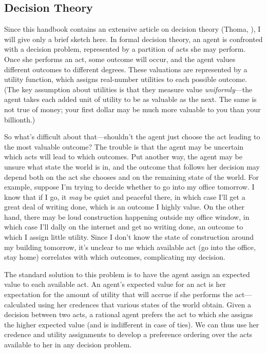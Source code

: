 \subsection{Decision Theory} \label{ss:decision}
Since this handbook contains an extensive article on decision theory (Thoma, ), I will give only a brief sketch here. In formal decision theory, an agent is confronted with a decision problem, represented by a partition of acts she may perform. Once she performs an act, some outcome will occur, and the agent values different outcomes to different degrees. These valuations are represented by a utility function, which assigns real-number utilities to each possible outcome. (The key assumption about utilities is that they measure value \emph{uniformly}---the agent takes each added unit of utility to be as valuable as the next. The same is not true of money; your first dollar may be much more valuable to you than your billionth.)  

So what's difficult about that---shouldn't the agent just choose the act leading to the most valuable outcome? The trouble is that the agent may be uncertain which acts will lead to which outcomes. Put another way, the agent may be unsure what state the world is in, and the outcome that follows her decision may depend both on the act she chooses and on the remaining state of the world. For example, suppose I'm trying to decide whether to go into my office tomorrow. I know that if I go, it \emph{may} be quiet and peaceful there, in which case I'll get a great deal of writing done, which is an outcome I highly value. On the other hand, there may be loud construction happening outside my office window, in which case I'll dally on the internet and get no writing done, an outcome to which I assign little utility. Since I don't know the state of construction around my building tomorrow, it's unclear to me which available act (go into the office, stay home) correlates with which outcomes, complicating my decision.

The standard solution to this problem is to have the agent assign an expected value to each available act. An agent's expected value for an act is her expectation for the amount of utility that will accrue if she performs the act---calculated using her credences that various states of the world obtain. Given a decision between two acts, a rational agent prefers the act to which she assigns the higher expected value (and is indifferent in case of ties). We can thus use her credence and utility assignments to develop a preference ordering over the acts available to her in any decision problem.

